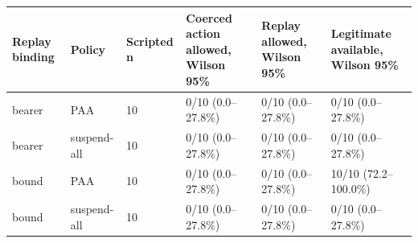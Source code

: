\begin{tabular}{llllll}
\hline
Replay binding & Policy & Scripted n & Coerced action allowed, Wilson 95\% & Replay allowed, Wilson 95\% & Legitimate available, Wilson 95\% \\
\hline
bearer & PAA & 10 & 0/10 (0.0--27.8\%) & 0/10 (0.0--27.8\%) & 0/10 (0.0--27.8\%) \\
bearer & suspend-all & 10 & 0/10 (0.0--27.8\%) & 0/10 (0.0--27.8\%) & 0/10 (0.0--27.8\%) \\
bound & PAA & 10 & 0/10 (0.0--27.8\%) & 0/10 (0.0--27.8\%) & 10/10 (72.2--100.0\%) \\
bound & suspend-all & 10 & 0/10 (0.0--27.8\%) & 0/10 (0.0--27.8\%) & 0/10 (0.0--27.8\%) \\
\hline
\end{tabular}
